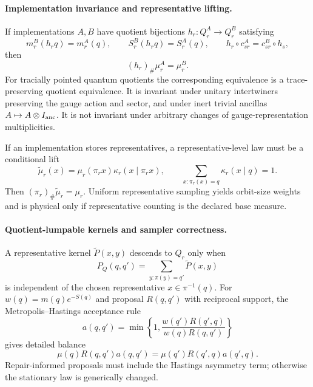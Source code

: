 \paragraph{Implementation invariance and representative lifting.}
If implementations \(A,B\) have quotient bijections \(h_r:Q_r^A\to Q_r^B\) satisfying
\[
m_r^B(h_rq)=m_r^A(q),\qquad
S_r^B(h_rq)=S_r^A(q),
\qquad
h_r\circ c_{sr}^A=c_{sr}^B\circ h_s,
\]
then
\[
(h_r)_\#\mu_r^A=\mu_r^B.
\]
For tracially pointed quantum quotients the corresponding equivalence is a trace-preserving
quotient equivalence.  It is invariant under unitary intertwiners preserving the gauge action and
sector, and under inert trivial ancillas \(A\mapsto A\otimes I_{\rm anc}\).  It is not invariant
under arbitrary changes of gauge-representation multiplicities.

If an implementation stores representatives, a representative-level law must be a conditional lift
\[
\widetilde\mu_r(x)=\mu_r(\pi_r x)\kappa_r(x\mid \pi_r x),
\qquad
\sum_{x:\pi_r(x)=q}\kappa_r(x\mid q)=1.
\]
Then \((\pi_r)_\#\widetilde\mu_r=\mu_r\).  Uniform representative sampling yields orbit-size
weights and is physical only if representative counting is the declared base measure.

\paragraph{Quotient-lumpable kernels and sampler correctness.}
A representative kernel \(\widetilde P(x,y)\) descends to \(Q_r\) only when
\[
P_Q(q,q')
=
\sum_{y:\pi(y)=q'}\widetilde P(x,y)
\]
is independent of the chosen representative \(x\in\pi^{-1}(q)\).  For
\(w(q)=m(q)e^{-S(q)}\) and proposal \(R(q,q')\) with reciprocal support, the
Metropolis--Hastings acceptance rule
\[
a(q,q')=\min\left\{1,
\frac{w(q')R(q',q)}{w(q)R(q,q')}
\right\}
\]
gives detailed balance
\[
\mu(q)R(q,q')a(q,q')=\mu(q')R(q',q)a(q',q).
\]
Repair-informed proposals must include the Hastings asymmetry term; otherwise the stationary law is
generically changed.

